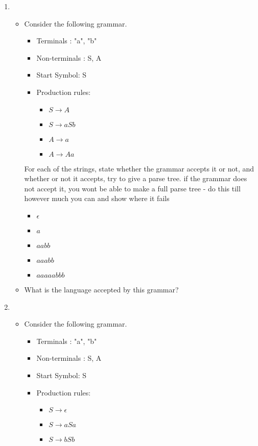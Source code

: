 \documentclass[10pt]{article}
\begin{document}
\begin{enumerate}
\item
\begin{itemize}
    \item Consider the following grammar. \\
    \begin{itemize}
        \item Terminals : "a", "b"
        \item Non-terminals : S, A
        \item Start Symbol: S
        \item Production rules:
        \begin{itemize}
            \item $S \rightarrow A$
            \item $S \rightarrow aSb$
            \item $A \rightarrow a$
            \item $A \rightarrow Aa$
        \end{itemize}
    \end{itemize}

    For each of the strings, state whether the grammar accepts it or not, and whether or not it accepts, try to give a parse tree. if the grammar does not accept it, you wont be able to make a full parse tree - do this till however much you can and show where it fails
    \begin{itemize}
        \item $\epsilon$
        \item $a$
        \item $aabb$
        \item $aaabb$
        \item $aaaaabbb$
    \end{itemize}
        \item What is the language accepted by this grammar?

\end{itemize}



\item
\begin{itemize}
    \item Consider the following grammar. \\
    \begin{itemize}
        \item Terminals : "a", "b"
        \item Non-terminals : S, A
        \item Start Symbol: S
        \item Production rules:
        \begin{itemize}
            \item $S \rightarrow \epsilon$
            \item $S \rightarrow aSa$
            \item $S \rightarrow bSb$
        \end{itemize}
    \end{itemize}


\end{itemize}
\end{enumerate}
\end{document}
